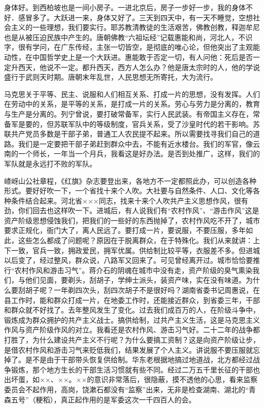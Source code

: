 身体好。到西柏坡也是一间小房子。一进北京后，房子一步好一步，我的身体不好．感冒多了。大跃进一来，身体又好了。三天到四天中，有一天不睡觉，空想社会主义的一些理想，我们要实行。耶苏教清教徒的生活艰苦，佛教创教，释迦牟尼也是从被压迫民族中产生的。唐朝佛教“六祖坛经”记载惠能和尚，河北人，不识字，很有学问，在广东传经，主张一切皆空，是彻底的唯心论，但他突出了主观能动性，在中国哲学史上是一个大跃进。惠能敢于否定一切，有人问他：死后是否一定升西天，他说不一定。都升西天，西方人怎么办？他是唐太宗时的人，他的学说盛行于武则天时期。唐朝末年乱世，人民思想无所寄托，大为流行。

马克思关于平等、民主、说服和人们相互关系、打成一片的思想，没有发挥。人们在劳动中的关系，是平等的关系，是打成一片的关系。劳心与劳力是分离的，教育与生产是分离的。列宁曾说，要打破常备军，实行人民武装。有帝国主义存在，常备军是要的，但苏联军队中的等级制度，官兵关系，受了沙皇时代的若干影响。苏联共产党员多数是干部子弟，普通工人农民提不起来。所以需要找寻我们自己的道路。我们是一定要把干部子弟赶到群众中去，不能有近水楼台。我们的军官，像云南的一个师长，一年当一个月兵，我看这是好办法。是否到处推广，这样，我们的军队就是永远打不败的军队。

嵖岈山公社章程，《红旗》杂志要登出来，各地方不一定都照此办，可以创造各种形式。要好好吹一下，一个省找十来个人吹。大社要与自然条件、人口、文化等各种条件结合起来。河北省×××同志，找来十来个人吹共产主义思想作风，很有劲，你们回去也这样吹一下。进城后，有人说我们有“农村作风”、“游击作风”这是资产阶级思想侵蚀我们，把我们的一些好的东西抛掉了，农村作风吃不开了，城市要求正规化，衙门大了，离人民远了。要打成一片，要说服，不要压服，多年如此，这些怎么都成了问题呢？原因在于脱离群众，在于特殊化。我们从来就讲：上下一致，官兵一致，拥政爱民，拥军优属。供给制比较平等，衣服差不多。但进城以后变了，经过整风，群众说，八路军又回来了。可见曾经离开过。城市恰恰要推行“农村作风和游击习气”。蒋介石的阴魂在城市中没有走，资产阶级的臭气熏染我们，与他们见面，要剃头，刮胡子，学绅士派头，装资产味，实在没有味道。为什么要刮胡子呢？一年剃四次头，刮四次胡子不是很好吗？湖南省委书记周惠说，在县工作时，能和群众打成一片，在地委工作时，还能接近群众，到省委三年，干部和群众就不好找了。去年整风发生了变化。过去我们成百万的人，在阶级斗争中，锻炼成为群众拥护的共产主义战士。搞供给制，过共产主义生活，这是马克思主义作风与资产阶级作风的对立。我看还是农村作风、游击习气好。二十二年的战争都打胜了，为什么建设共产主义不行呢？为什么要搞工资制？这是向资产阶级让步，是借农村作风和游击习气来贬低我们，结果发展了个人主义。讲说服不要压服就忘掉了。是不是由于干部带头恢复供给制。华东老根据地搞过地道战，北方都经过战争锻炼，那个地方生长的干部生活习惯就有些不同。经过二万五千里长征的干部也出坏蛋，如××、××。××的意识非常落后，很隐蔽，摸不透他的心思，看来监察委员会不起作用，高岗，饶漱石都没有“监察”出来，无非是检查湖南、湖北的“青森五号”（粳稻），真正起作用的是军委这次一千四百人的会。

